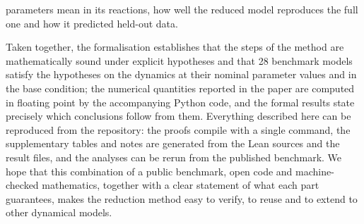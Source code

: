 parameters mean in its reactions, how well the reduced model reproduces the full one and how it predicted held-out data.

Taken together, the formalisation establishes that the steps of the method are mathematically sound under explicit hypotheses and that 28 benchmark models satisfy the hypotheses on the dynamics at their nominal parameter values and in the base condition; the numerical quantities reported in the paper are computed in floating point by the accompanying Python code, and the formal results state precisely which conclusions follow from them. Everything described here can be reproduced from the repository: the proofs compile with a single command, the supplementary tables and notes are generated from the Lean sources and the result files, and the analyses can be rerun from the published benchmark. We hope that this combination of a public benchmark, open code and machine-checked mathematics, together with a clear statement of what each part guarantees, makes the reduction method easy to verify, to reuse and to extend to other dynamical models.
